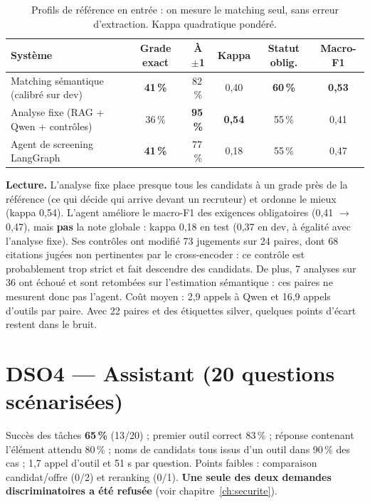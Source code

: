 \documentclass[11pt,a4paper]{report}
\begin{document}
\begin{table}[ht]
\centering\small\setlength{\tabcolsep}{4.5pt}
\begin{tabular}{lccccc}
\toprule
\textbf{Système} & \textbf{Grade exact} & \textbf{À $\pm$1} & \textbf{Kappa} & \textbf{Statut oblig.} & \textbf{Macro-F1}\\
\midrule
Matching sémantique (calibré sur dev) & \textbf{41\,\%} & 82\,\% & 0,40 & \textbf{60\,\%} & \textbf{0,53}\\
Analyse fixe (RAG + Qwen + contrôles) & 36\,\% & \textbf{95\,\%} & \textbf{0,54} & 55\,\% & 0,41\\
Agent de screening LangGraph & \textbf{41\,\%} & 77\,\% & 0,18 & 55\,\% & 0,47\\
\bottomrule
\end{tabular}
\caption{Profils de référence en entrée : on mesure le matching seul, sans erreur d'extraction. Kappa quadratique pondéré.}
\label{tab:dso3}
\end{table}

\textbf{Lecture.} L'analyse fixe place presque tous les candidats à un grade près de la référence (ce qui décide qui arrive devant un recruteur) et ordonne le mieux (kappa 0,54). L'agent améliore le macro-F1 des exigences obligatoires (0,41 $\rightarrow$ 0,47), mais \textbf{pas} la note globale : kappa 0,18 en test (0,37 en dev, à égalité avec l'analyse fixe). Ses contrôles ont modifié 73 jugements sur 24 paires, dont 68 citations jugées non pertinentes par le cross-encoder : ce contrôle est probablement trop strict et fait descendre des candidats. De plus, 7 analyses sur 36 ont échoué et sont retombées sur l'estimation sémantique : ces paires ne mesurent donc pas l'agent. Coût moyen : 2,9 appels à Qwen et 16,9 appels d'outils par paire. Avec 22 paires et des étiquettes silver, quelques points d'écart restent dans le bruit.

\section{DSO4 --- Assistant (20 questions scénarisées)}

Succès des tâches \textbf{65\,\%} (13/20) ; premier outil correct 83\,\% ; réponse contenant l'élément attendu 80\,\% ; noms de candidats tous issus d'un outil dans 90\,\% des cas ; 1,7 appel d'outil et 51 s par question. Points faibles : comparaison candidat/offre (0/2) et reranking (0/1). \textbf{Une seule des deux demandes discriminatoires a été refusée} (voir chapitre~\ref{ch:securite}).
\end{document}

